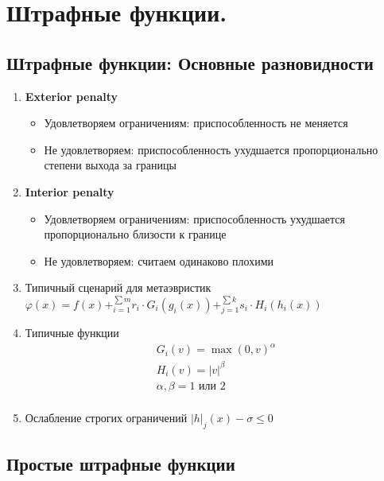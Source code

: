 \section{Штрафные функции.}

\subsection{Штрафные функции: Основные разновидности}
\begin{enumerate}
    \item \textbf{Exterior penalty}
    \begin{itemize}
        \item Удовлетворяем ограничениям: приспособленность не меняется
        \item Не удовлетворяем: приспособленность ухудшается пропорционально степени выхода за границы
    \end{itemize}


    \item \textbf{Interior penalty}
    \begin{itemize}
        \item  Удовлетворяем ограничениям: приспособленность ухудшается пропорционально близости к границе
        \item  Не удовлетворяем: считаем одинаково плохими
    \end{itemize}

    \item Типичный сценарий для метаэвристик $\varphi(x) = f(x) + ^{\sum m} _{i=1} r_{i} \cdot G_{i}(g_{i}(x)) + ^{\sum k} _{j=1} s_{i} \cdot H_{i}(h_{i}(x))$
    \item Типичные функции \begin{gather*}
                               G_{i}(v) = \max(0, v)^{\alpha}\\
                               H_{i}(v) = |v|^{\beta}\\
                               \alpha, \beta = 1 \text{ или } 2\\
    \end{gather*}
    \item Ослабление строгих ограничений $|h|_{j}(x) - \sigma \leq 0$
\end{enumerate}


\subsection{Простые штрафные функции}

